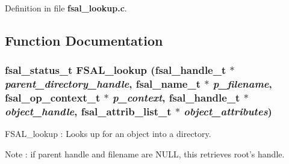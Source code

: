 Definition in file {\bf fsal\_\-lookup.c}.

\subsection{Function Documentation}
\subsubsection{\setlength{\rightskip}{0pt plus 5cm}fsal\_\-status\_\-t FSAL\_\-lookup (fsal\_\-handle\_\-t $\ast$ {\em parent\_\-directory\_\-handle}, fsal\_\-name\_\-t $\ast$ {\em p\_\-filename}, fsal\_\-op\_\-context\_\-t $\ast$ {\em p\_\-context}, fsal\_\-handle\_\-t $\ast$ {\em object\_\-handle}, fsal\_\-attrib\_\-list\_\-t $\ast$ {\em object\_\-attributes})}\label{fsal__lookup_8c_a0}


FSAL\_\-lookup : Looks up for an object into a directory.

Note : if parent handle and filename are NULL, this retrieves root's handle.

